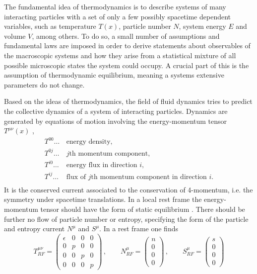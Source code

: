 The fundamental idea of thermodynamics is to describe systems of many interacting particles with a set of only a few possibly spacetime dependent variables, such as temperature $T(x)$, particle number $N$, system energy $E$ and volume $V$, among others. To do so, a small number of assumptions and fundamental laws are imposed in order to derive statements about observables of the macroscopic systems and how they arise from a statistical mixture of all possible microscopic states the system could occupy. A crucial part of this is the assumption of thermodynamic equilibrium, meaning a systems extensive parameters do not change. 

Based on the ideas of thermodynamics, the field of fluid dynamics tries to predict the collective dynamics of a system of interacting particles.
Dynamics are generated by equations of motion involving the energy-momentum tensor $T^{\mu\nu}(x)$ \cite{Ollitrault_2008},
\begin{equation}
    \begin{split}
        T^{00}\dots\,&\text{energy density,}\\
        T^{0j}\dots\,&\text{$j$th momentum component,}\\
        T^{i0}\dots\,&\text{energy flux in direction $i$,}\\
        T^{ij}\dots\,&\text{flux of $j$th momentum component in direction $i$.}\\
    \end{split}
\end{equation}
It is the conserved current associated to the conservation of 4-momentum, i.e. the symmetry under spacetime translations.  In a local rest frame the energy-momentum tensor should have the form of static equilibrium . There should be further no flow of particle number or entropy, specifying the form of the particle and entropy current $N^\mu$ and $S^\mu$. In a rest frame one finds
\begin{equation}
    T^{\mu\nu}_{RF}  =
        \begin{pmatrix}
            \epsilon & 0 & 0 & 0 \\
            0        & p & 0 & 0 \\
            0        & 0 & p & 0 \\
            0        & 0 & 0 & p
        \end{pmatrix}\,,\qquad
        N^\mu_{RF}       =
        \begin{pmatrix}
            n\\0\\0\\0
        \end{pmatrix}\,,\qquad
        S^\mu_{RF}       =
        \begin{pmatrix}
            s\\0\\0\\0
        \end{pmatrix}
        \label{eq:FluidMechanics_RestFrame_Quantities}
\end{equation}
